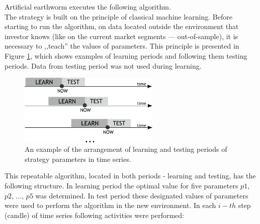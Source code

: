 \documentclass[runningheads,a4paper]{llncs}
\begin{document}
Artificial earthworm executes the following algorithm.\\
The strategy is built on the principle of classical machine learning. Before starting to run the algorithm, on data located outside the environment that investor knows (like on the current market segments --- out-of-sample), it is necessary to ,,teach''  the values of parameters. This principle is presented in Figure \ref{fig:fig2}, which shows examples of learning periods and following them testing periods. Data from testing period was not used during learning.\\
\begin{figure}[ht]
\centering
\includegraphics[width = 0.6\textwidth]{figures/rys2.png}
\caption{An example of the arrangement of learning and testing periods of strategy parameters in time series.}
\label{fig:fig2}
\end{figure}
\FloatBarrier
\vspace{-1em}
This repeatable algorithm, located in both periods - learning and testing, has the following structure. In learning period the optimal value for five parameters $p1$, $p2$, ..., $p5$ was determined. In test period these designated values of parameters were used to perform the algorithm in the new environment. In each $i-th$ step (candle) of time series following activities were performed:
\end{document}
